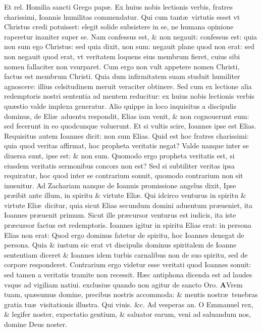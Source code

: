 \documentclass[a5paper,10pt]{book}
\def\ae{æ}
\begin{document}
\begin{multicols*}{2}
\newline \color{red} Et rel. Homilia sancti Grego pap\ae . \color{black}
\newline \color{red} E\color{black}x huius nobis lectionis verbis, fratres charissimi, Ioannis humilitas commendatur.
Qui cum tant\ae \ virtutis esset vt Christus credi potuisset: elegit solide subsistere in se, ne humana opinione raperetur inaniter super se.
Nam confessus est, \& non negauit: confessus est: quia non sum ego Christus: sed quia dixit, non sum: negauit plane quod non erat: sed non negauit quod erat, vt veritatem loquens eius membrum fieret, cuius sibi nomen fallaciter non vsurparet.
Cum ergo non vult appetere nomen Christi, factus est membrum Christi.
Quia dum infirmitatem suam studuit humiliter agnoscere: illius celsitudinem meruit veraciter obtinere. Sed cum ex lectione alia redemptoris nostri sententia ad mentem reducitur: ex huius nobis lectionis verbis qu\ae stio valde implexa generatur.
Alio quippe in loco inquisitus a discipulis dominus, de Eli\ae \ aduentu respondit, Elias iam venit, \& non cognouerunt eum: sed fecerunt in eo quodcunque voluerunt.
Et si vultis scire, Ioannes ipse est Elias.
Requisitus autem Ioannes dicit: non sum Elias.
Quid est hoc fratres charissimi: quia quod veritas affirmat, hoc propheta veritatis negat?
Valde nanque inter se diuersa sunt, ipse est: \& non sum.
Quomodo ergo propheta veritatis est, si eiusdem veritatis sermonibus concors non est?
Sed si subtiliter veritas ipsa requiratur, hoc quod inter se contrarium sonuit, quomodo contrarium non sit inuenitur.
Ad Zachariam nanque de Ioannis promissione angelus dixit, Ipse pr\ae ibit ante illum, in spiritu \& virtute Eli\ae .
Qui idcirco venturus in spiritu \& virtute Eli\ae \ dicitur, quia sicut
Elias secundum domini aduentum pr\ae ueniet, ita Ioannes pr\ae uenit primum.
Sicut ille pr\ae cursor venturus est iudicis, ita iste pr\ae cursor factus est redemptoris.
Ioannes igitur in spiritu Elias erat: in persona Elias non erat: Quod ergo dominus fatetur de spiritu, hoc Ioannes denegat de persona.
Quia \& iustum sic erat vt discipulis dominus spiritalem de Ioanne sententiam diceret \& Ioannes idem turbis carnalibus non de suo spiritu, sed de corpore responderet.
Contrarium ergo videtur esse veritati quod Ioannes sonuit: sed tamen a veritatis tramite non recessit.
\newline \color{red} H\ae c antiphona dicenda est ad laudes vsque ad vigiliam natiui. exclusiue quando non agitur de sancto Oro. \color{black}
\vspace{-.25em}
\lettrine[lines=2]{\bfseries \color{red} A}{}Vrem tuam, qu\ae sumus domine, precibus nostris accommoda: \& mentis nostr\ae \ tenebras gratia tu\ae \ visitationis illustra. Qui viuis. \&c. \color{red} Ad vesperas an. \color{black} O Emmanuel rex, \& legifer noster, expectatio gentium, \& saluator earum, veni ad saluandum nos, domine Deus noster.

\end{multicols*}
\end{document}
